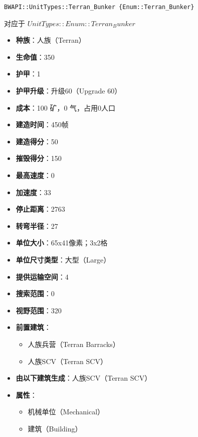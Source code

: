 \begin{tcolorbox}[colback=white, colframe=black!60!white, title=Terran\_Bunker(), arc=0mm]
    \begin{verbatim}
BWAPI::UnitTypes::Terran_Bunker {Enum::Terran_Bunker}
    \end{verbatim}
    对应于  $ UnitTypes::Enum::Terran_Bunker $ 
    \begin{itemize}
        \item \textbf{种族}：人族（Terran）
        \item \textbf{生命值}：350
        \item \textbf{护甲}：1
        \item \textbf{护甲升级}：升级60（Upgrade 60）
        \item \textbf{成本}：100 矿，0 气，占用0人口
        \item \textbf{建造时间}：450帧
        \item \textbf{建造得分}：50
        \item \textbf{摧毁得分}：150
        \item \textbf{最高速度}：0
        \item \textbf{加速度}：33
        \item \textbf{停止距离}：2763
        \item \textbf{转弯半径}：27
        \item \textbf{单位大小}：65x41像素；3x2格
        \item \textbf{单位尺寸类型}：大型（Large）
        \item \textbf{提供运输空间}：4
        \item \textbf{搜索范围}：0
        \item \textbf{视野范围}：320
        \item \textbf{前置建筑}：
            \begin{itemize}
                \item 人族兵营（Terran Barracks）
                \item 人族SCV（Terran SCV）
            \end{itemize}
        \item \textbf{由以下建筑生成}：人族SCV（Terran SCV）
        \item \textbf{属性}：
            \begin{itemize}
                \item 机械单位（Mechanical）
                \item 建筑（Building）
            \end{itemize}
    \end{itemize}
\end{tcolorbox}

